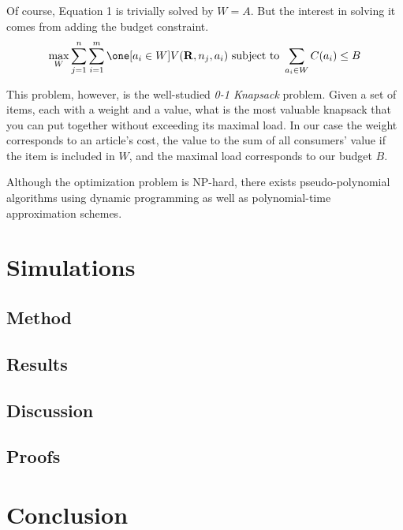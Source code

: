 \documentclass{article}
\begin{document}
Of course, Equation 1 is trivially solved by $W=A$. 
But the interest in solving it comes from adding the budget constraint.
\begin{equation}
\max_W \sum_{j=1}^n \sum_{i=1}^m \one [a_i\in W] V(\mathbf{R}, n_j, a_i) \text{ subject to } \sum_{a_i \in W} C(a_i) \leq B
\end{equation}

This problem, however, is the well-studied {\em 0-1 Knapsack} problem. 
Given a set of items, each with a weight and a value, 
what is the most valuable knapsack that you can put together without exceeding its maximal load. 
In our case the weight corresponds to an article's cost, 
the value to the sum of all consumers' value if the item is included in $W$, 
and the maximal load corresponds to our budget $B$. 

Although the optimization problem is NP-hard, there exists pseudo-polynomial algorithms using dynamic programming 
as well as polynomial-time approximation schemes. 

\section{Simulations}
\subsection{Method}
\subsection{Results}
\subsection{Discussion}
\subsection{Proofs}

\section{Conclusion}



\end{document}
